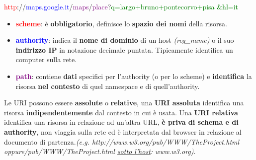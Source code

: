 \documentclass[11pt,a4paper]{article}
\theoremstyle{definition}
\begin{document}
\textcolor{red}{http}://\textcolor{blue}{maps.google.it}/\textcolor{purple}{maps}/\textcolor{purple}{place}?\textcolor{green}{q=largo+bruno+pontecorvo+pisa
	\&hl=it}
\begin{itemize}
	\item \textcolor{red}{\textbf{scheme}}: è \textbf{obbligatorio}, definisce lo \textbf{spazio dei nomi} della risorsa.
	\item \textcolor{blue}{\textbf{authority}}: indica il \textbf{nome di dominio} di un host \textit{(reg\_name)} o il suo \textbf{indirizzo IP} in notazione decimale puntata. Tipicamente identifica un computer sulla rete.
	\item \textcolor{purple}{\textbf{path}}: contiene \textbf{dati} specifici per l’authority (o per lo scheme) e \textbf{identifica} la risorsa \textbf{nel contesto} di quel namespace e di quell'authority.
\end{itemize}
Le URI possono essere \textbf{assolute} o \textbf{relative}, una \textbf{URI assoluta} identifica una risorsa \textbf{indipendentemente} dal contesto in cui è usata. Una \textbf{URI relativa} identifica una risorsa in relazione ad un'altra URL, \textbf{è priva di schema e di authority}, non viaggia sulla rete ed è interpretata dal browser in relazione al documento di partenza.\newline \textit{(e.g. http://www.w3.org/pub/WWW/TheProject.html oppure\newline /pub/WWW/TheProject.html \underline{sotto l'host}: www.w3.org)}.
\end{document}
